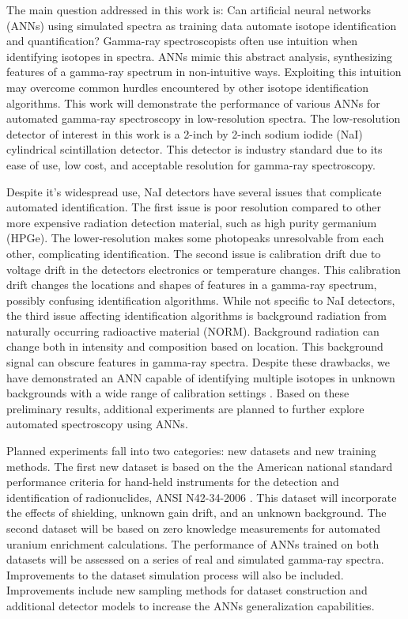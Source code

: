\documentclass[tocnosub,noragright,centerchapter,12pt,fullpage]{uiucecethesis09}
\begin{document}
The main question addressed in this work is: Can artificial neural networks (ANNs) using simulated spectra as training data automate isotope identification and quantification? Gamma-ray spectroscopists often use intuition when identifying isotopes in spectra. ANNs mimic this abstract analysis, synthesizing features of a gamma-ray spectrum in non-intuitive ways. Exploiting this intuition may overcome common hurdles encountered by other isotope identification algorithms. This work will demonstrate the performance of various ANNs for automated gamma-ray spectroscopy in low-resolution spectra. The low-resolution detector of interest in this work is a 2-inch by 2-inch sodium iodide (NaI) cylindrical scintillation detector. This detector is industry standard due to its ease of use, low cost, and acceptable resolution for gamma-ray spectroscopy. 

Despite it's widespread use, NaI detectors have several issues that complicate automated identification. The first issue is poor resolution compared to other more expensive radiation detection material, such as high purity germanium (HPGe). The lower-resolution makes some photopeaks unresolvable from each other, complicating identification. The second issue is calibration drift due to voltage drift in the detectors electronics or temperature changes. This calibration drift changes the locations and shapes of features in a gamma-ray spectrum, possibly confusing identification algorithms. While not specific to NaI detectors, the third issue affecting identification algorithms is background radiation from naturally occurring radioactive material (NORM). Background radiation can change both in intensity and composition based on location. This background signal can obscure features in gamma-ray spectra. Despite these drawbacks, we have demonstrated an ANN capable of identifying multiple isotopes in unknown backgrounds with a wide range of calibration settings \cite{kamudaThesis2017,kamuda2017}. Based on these preliminary results, additional experiments are planned to further explore automated spectroscopy using ANNs.

Planned experiments fall into two categories: new datasets and new training methods. The first new dataset is based on the the American national standard performance criteria for hand-held instruments for the detection and identification of radionuclides, ANSI N42-34-2006 \cite{ANSI}. This dataset will incorporate the effects of shielding, unknown gain drift, and an unknown background. The second dataset will be based on zero knowledge measurements for automated uranium enrichment calculations. The performance of ANNs trained on both datasets will be assessed on a series of real and simulated gamma-ray spectra. Improvements to the dataset simulation process will also be included. Improvements include new sampling methods for dataset construction and additional detector models to increase the ANNs generalization capabilities.
\end{document}
